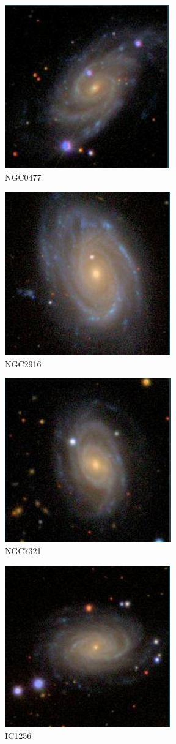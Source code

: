 \documentclass[9pt]{revtex4-1}
\begin{document}
\begin{figure}
\includegraphics[scale=0.3]{NGC0477.png}
\caption{NGC0477}
\end{figure}
\begin{figure}
\includegraphics[scale=0.3]{NGC2916.png}
\caption{NGC2916}
\end{figure}
\begin{figure}
\includegraphics[scale=0.3]{NGC7321.png}
\caption{NGC7321}
\end{figure}
\begin{figure}
\includegraphics[scale=0.3]{IC1256.png}
\caption{IC1256}
\end{figure}
\end{document}
